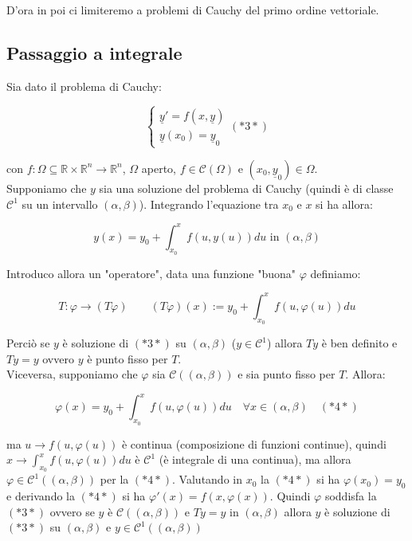 \documentclass[a4paper,11pt,titlepage]{book}
\begin{document}
 D'ora in poi ci limiteremo a problemi di Cauchy del primo ordine vettoriale.
 
 \subsection{Passaggio a integrale}

Sia dato il problema di Cauchy: 

$$\begin{cases}
\underline{y}'=f(x,\underline{y})\\
\underline{y}(x_0)=\underline{y}_0
\end{cases} (*3*) $$

con $f:\Omega\subseteq\mathbb{R}\times\mathbb{R}^n\to\mathbb{R}^n$, $\Omega$ aperto, $f\in\mathcal{C}(\Omega)$ e $(x_0,\underline{y}_0)\in\Omega$.\\

Supponiamo che $y$ sia una soluzione del problema di Cauchy (quindi è di classe $\mathcal{C}^1$ su un intervallo $(\alpha,\beta)$). Integrando l'equazione tra $x_0$ e $x$ si ha allora:

$$y(x)=y_0+\int_{x_0}^x f(u,y(u))du\mbox{ in } (\alpha,\beta)$$ 

Introduco allora un "operatore", data una funzione "buona" $\varphi$ definiamo:

$$T:\varphi\to (T\varphi) \qquad (T\varphi)(x):=y_0+\int_{x_0}^x f(u,\varphi(u))du$$

Perciò se  $y$ è soluzione di $(*3*)$ su $(\alpha,\beta)$ ($y\in\mathcal{C}^1$) allora $Ty$ è ben definito e $Ty=y$ ovvero $y$ è punto fisso per $T$.\\

Viceversa, supponiamo che $\varphi$ sia $\mathcal{C}((\alpha,\beta))$ e sia punto fisso per $T$. Allora: 

$$\varphi(x)=y_0+\int_{x_0}^x f(u,\varphi(u))du\quad\forall x\in(\alpha,\beta)\quad (*4*)$$

ma $u\to f(u,\varphi(u))$ è continua (composizione di funzioni continue), quindi $x\to\int_{x_0}^x f(u,\varphi(u)) du$ è $\mathcal{C}^1$ (è integrale di una continua), ma allora $\varphi\in\mathcal{C}^1((\alpha,\beta))$ per la $(*4*)$. Valutando in $x_0$ la $(*4*)$ si ha $\varphi(x_0)=y_0$ e derivando la $(*4*)$ si ha $\varphi'(x)=f(x,\varphi(x))$. Quindi $\varphi$ soddisfa la $(*3*)$ ovvero se $y$ è $\mathcal{C}((\alpha,\beta))$ e $Ty=y$ in $(\alpha,\beta)$ allora $y$ è soluzione di $(*3*)$ su $(\alpha,\beta)$ e $y\in\mathcal{C}^1((\alpha,\beta))$\\
\end{document}
